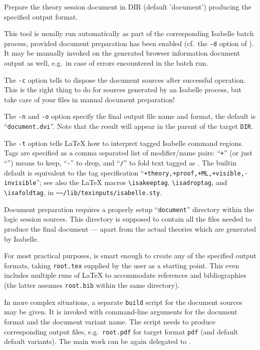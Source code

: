 \begin{isabellebody}
\begin{isamarkuptext}
\begin{ttbox}
  Prepare the theory session document in DIR (default 'document')
  producing the specified output format.
\end{ttbox}
  This tool is usually run automatically as part of the corresponding
  Isabelle batch process, provided document preparation has been
  enabled (cf.\ the \verb|-d| option of \hyperlink{tool.usedir}{\mbox{}}).
  It may be manually invoked on the generated browser information
  document output as well, e.g.\ in case of errors encountered in the
  batch run.

  \medskip The \verb|-c| option tells \hyperlink{tool.document}{\mbox{}} to
  dispose the document sources after successful operation.  This is
  the right thing to do for sources generated by an Isabelle process,
  but take care of your files in manual document preparation!

  \medskip The \verb|-n| and \verb|-o| option specify
  the final output file name and format, the default is ``\verb|document.dvi|''.  Note that the result will appear in the parent of
  the target \verb|DIR|.

  \medskip The \verb|-t| option tells {\LaTeX} how to interpret
  tagged Isabelle command regions.  Tags are specified as a comma
  separated list of modifier/name pairs: ``\verb|+|'' (or just ``'') means to keep, ``\verb|-|'' to drop, and ``\verb|/|'' to
  fold text tagged as .  The builtin default is equivalent
  to the tag specification ``\verb|+theory,+proof,+ML,+visible,-invisible|''; see also the {\LaTeX}
  macros \verb|\isakeeptag|, \verb|\isadroptag|, and
  \verb|\isafoldtag|, in \verb|~~/lib/texinputs/isabelle.sty|.

  \medskip Document preparation requires a properly setup ``\verb|document|'' directory within the logic session sources.  This
  directory is supposed to contain all the files needed to produce the
  final document --- apart from the actual theories which are
  generated by Isabelle.

  \medskip For most practical purposes, \hyperlink{tool.document}{\mbox{}} is smart
  enough to create any of the specified output formats, taking
  \verb|root.tex| supplied by the user as a starting point.  This
  even includes multiple runs of {\LaTeX} to accommodate references
  and bibliographies (the latter assumes \verb|root.bib| within
  the same directory).

  In more complex situations, a separate \verb|build| script for
  the document sources may be given.  It is invoked with command-line
  arguments for the document format and the document variant name.
  The script needs to produce corresponding output files, e.g.\
  \verb|root.pdf| for target format \verb|pdf| (and default
  default variants).  The main work can be again delegated to \hyperlink{tool.latex}{\mbox{}}.


\end{isamarkuptext}
\end{isabellebody}
